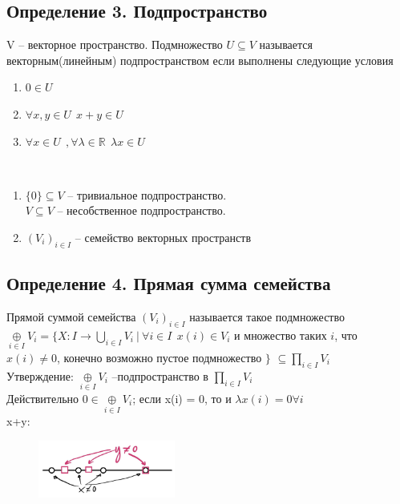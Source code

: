 \documentclass[a4paper,12pt]{article} %
\begin{document}
 	 	\subsection{Определение 3. Подпространство}
 	 	
 	 	V -- векторное пространство. Подмножество $U \subseteq V$ называется векторным(линейным) подпространством если выполнены следующие условия\\
 	 	\begin{enumerate}[1.]
 	 		\item $0 \in U$
 	 		\item $\forall x,y \in U \ \ x+y \in U$
 	 		\item $\forall x \in U \ \ , \forall \lambda \in \mathbb{R} \ \ \lambda x \in U$
 	 	\end{enumerate}
 	 	
 	 	\textbf{}\\ 
 	 	\begin{enumerate}[1.]\item $\{0\} \subseteq V$ -- тривиальное подпространство.\\
 	 	$V \subseteq V $ -- несобственное подпространство.
 	 	\item $(V_i)_{i \in I}$ -- семейство векторных пространств  
 	 	\end{enumerate}
 	 	
 	 	\subsection{Определение 4. Прямая сумма семейства}
 	 	Прямой суммой семейства $(V_i)_{i \in I}$ называется такое подмножество\\
 	 	 $\underset{i \in I}{\oplus} V_i = \{X:I \to \underset{i \in I}{\bigcup}  V_i \ | \ \forall i \in I  \ \ x(i) \in V_i$ и множество таких $i$, что $x(i) \neq 0$, конечно возможно пустое подмножество $\}$ $\subseteq \underset{i \in I}{\prod} V_i$\\
 	 	 
 	 	 Утверждение: $\underset{i \in I}{\oplus}V_i$ --подпространство в $\underset{i \in I }{\prod} V_i$\\
 	 	 
 	 	 Действительно $0 \in \underset{i \in I}{\oplus}V_i$; если x(i) = 0, то и $\lambda x(i) = 0 \forall i$ \\
 	 	 
 	 	 x+y: \begin{figure}[h!]
 	 	 	\begin{center}
 	 	 		\includegraphics[width=0.4\textwidth]{123}
 	 	 	\end{center}
 	 	 \end{figure} \\
 	 	 
\end{document}
